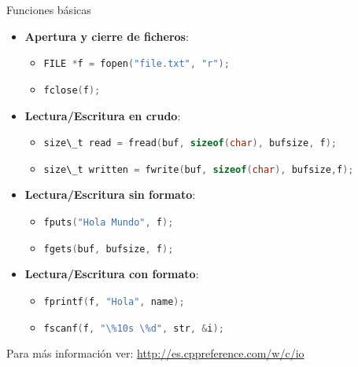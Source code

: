 \documentclass{mybeamer}
\begin{document}
\begin{framesec}[Funciones]{Funciones básicas}
	\begin{itemize}
		\item \textbf{Apertura y cierre de ficheros}:
		\begin{itemize}
			\item \lstinline[language=C, basicstyle=\small]|FILE *f = fopen("file.txt", "r");|
			\item \lstinline[language=C, basicstyle=\small]|fclose(f);|
		\end{itemize}

		\item \textbf{Lectura/Escritura en crudo}:
		\begin{itemize}
			\item \lstinline[language=C, basicstyle=\small]|size\_t read = fread(buf, sizeof(char), bufsize, f);|
			\item \lstinline[language=C, basicstyle=\small]|size\_t written = fwrite(buf, sizeof(char), bufsize,f);|
		\end{itemize}

		\item \textbf{Lectura/Escritura sin formato}:
		\begin{itemize}
			\item \lstinline[language=C, basicstyle=\small]|fputs("Hola Mundo", f);|
			\item \lstinline[language=C, basicstyle=\small]|fgets(buf, bufsize, f);|
		\end{itemize}

		\item \textbf{Lectura/Escritura con formato}:
		\begin{itemize}
			\item \lstinline[language=C, basicstyle=\small]|fprintf(f, "Hola", name);|
			\item \lstinline[language=C, basicstyle=\small]|fscanf(f, "\%10s \%d", str, &i);|
		\end{itemize}
	\end{itemize}

	\vspace{1em}
	\begin{center}
	Para más información ver: \url{http://es.cppreference.com/w/c/io}
	\end{center}
\end{framesec}
\end{document}
